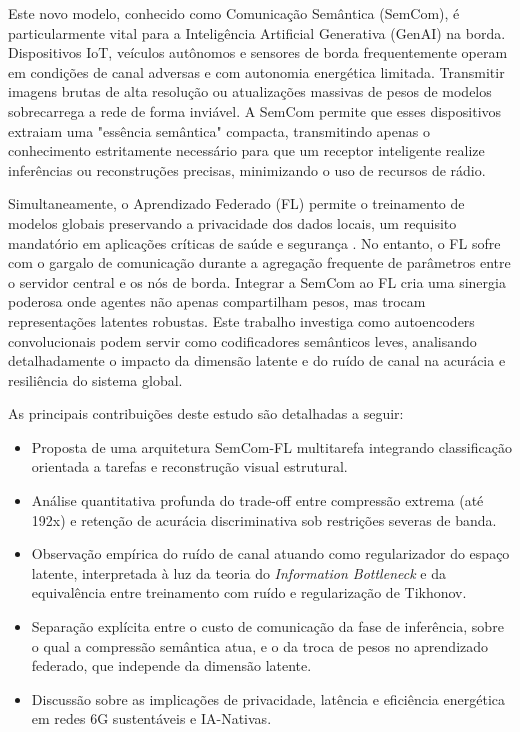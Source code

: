 \documentclass[conference,twocolumn]{IEEEtran}
\begin{document}
Este novo modelo, conhecido como Comunicação Semântica (SemCom), é particularmente vital para a Inteligência Artificial Generativa (GenAI) na borda. Dispositivos IoT, veículos autônomos e sensores de borda frequentemente operam em condições de canal adversas e com autonomia energética limitada. Transmitir imagens brutas de alta resolução ou atualizações massivas de pesos de modelos sobrecarrega a rede de forma inviável. A SemCom permite que esses dispositivos extraiam uma "essência semântica" compacta, transmitindo apenas o conhecimento estritamente necessário para que um receptor inteligente realize inferências ou reconstruções precisas, minimizando o uso de recursos de rádio.

Simultaneamente, o Aprendizado Federado (FL) permite o treinamento de modelos globais preservando a privacidade dos dados locais, um requisito mandatório em aplicações críticas de saúde e segurança \cite{mcmahan2017}. No entanto, o FL sofre com o gargalo de comunicação durante a agregação frequente de parâmetros entre o servidor central e os nós de borda. Integrar a SemCom ao FL cria uma sinergia poderosa onde agentes não apenas compartilham pesos, mas trocam representações latentes robustas. Este trabalho investiga como autoencoders convolucionais podem servir como codificadores semânticos leves, analisando detalhadamente o impacto da dimensão latente e do ruído de canal na acurácia e resiliência do sistema global.

As principais contribuições deste estudo são detalhadas a seguir:
\begin{itemize}
    \item Proposta de uma arquitetura SemCom-FL multitarefa integrando classificação orientada a tarefas e reconstrução visual estrutural.
    \item Análise quantitativa profunda do trade-off entre compressão extrema (até 192x) e retenção de acurácia discriminativa sob restrições severas de banda.
    \item Observação empírica do ruído de canal atuando como regularizador do espaço latente, interpretada à luz da teoria do \textit{Information Bottleneck} e da equivalência entre treinamento com ruído e regularização de Tikhonov.
    \item Separação explícita entre o custo de comunicação da fase de inferência, sobre o qual a compressão semântica atua, e o da troca de pesos no aprendizado federado, que independe da dimensão latente.
    \item Discussão sobre as implicações de privacidade, latência e eficiência energética em redes 6G sustentáveis e IA-Nativas.
\end{itemize}
\end{document}
